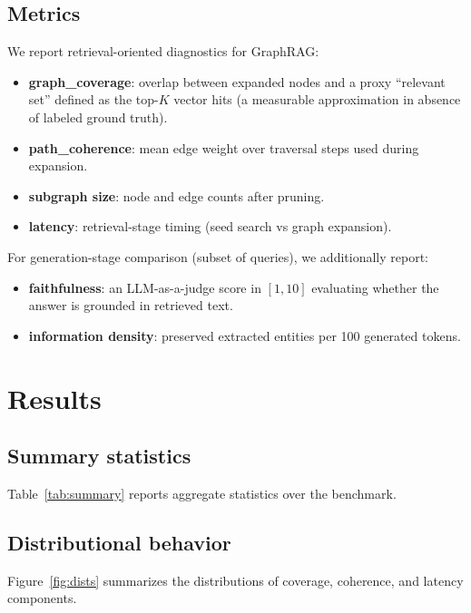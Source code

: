 \documentclass[11pt]{article}
\begin{document}
\subsection{Metrics}
We report retrieval-oriented diagnostics for GraphRAG:
\begin{itemize}[leftmargin=*]
  \item \textbf{graph\_coverage}: overlap between expanded nodes and a proxy ``relevant set'' defined as the top-$K$ vector hits (a measurable approximation in absence of labeled ground truth).
  \item \textbf{path\_coherence}: mean edge weight over traversal steps used during expansion.
  \item \textbf{subgraph size}: node and edge counts after pruning.
  \item \textbf{latency}: retrieval-stage timing (seed search vs graph expansion).
\end{itemize}
For generation-stage comparison (subset of queries), we additionally report:
\begin{itemize}[leftmargin=*]
  \item \textbf{faithfulness}: an LLM-as-a-judge score in $[1,10]$ evaluating whether the answer is grounded in retrieved text.
  \item \textbf{information density}: preserved extracted entities per 100 generated tokens.
\end{itemize}

\section{Results}
\subsection{Summary statistics}
Table~\ref{tab:summary} reports aggregate statistics over the benchmark.

\begin{table}[h]
\centering
\caption{GraphRAG retrieval diagnostics over 25 queries.}
\label{tab:summary}

\end{table}

\subsection{Distributional behavior}
Figure~\ref{fig:dists} summarizes the distributions of coverage, coherence, and latency components.
\end{document}

